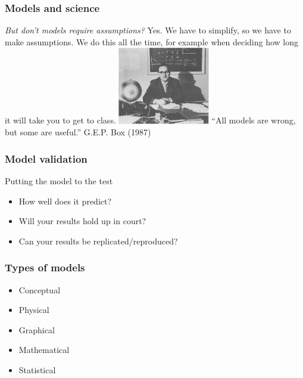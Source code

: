 \documentclass[color=usenames,dvipsnames]{beamer}\usepackage[]{graphicx}\usepackage[]{color}
\begin{document}
\begin{frame}
  \frametitle{Models and science}
  \large
  {\it But don't models require assumptions?}
  \pause
  \vfill
  Yes. We have to simplify, so we have to make assumptions.
  \pause
  \vfill
  We do this all the time, for example when deciding how long it will take you to get to class. 
  \pause
  \vfill
  \includegraphics[width=0.3\textwidth]{figs/box}
  ``All models are wrong, but some are useful.'' G.E.P. Box (1987)
\end{frame}




\begin{frame}
  \frametitle{Model validation}
  \large
  {%
    Putting the model to the test}
  \begin{itemize}[<+->]
    \item How well does it predict?
    \item Will your results hold up in court?
    \item Can your results be replicated/reproduced?
  \end{itemize}
\end{frame}






\begin{frame}
  \frametitle{Types of models}
  \Large
  \begin{itemize}
    \item { Conceptual}
    \item Physical
    \item Graphical
    \item {\color<2>{Red} Mathematical}
    \item { Statistical}
  \end{itemize}
\end{frame}
\end{document}
